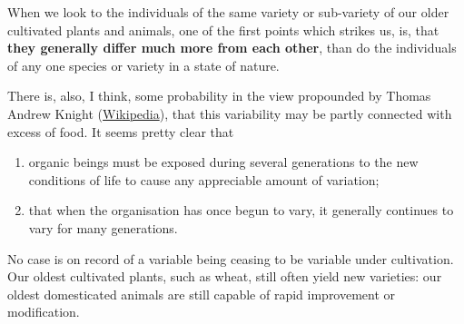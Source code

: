 When we look to the individuals of the same variety or sub-variety of our older cultivated plants and animals, one of the first points which strikes us, is, that \textbf{they generally differ much more from each other}, than do the individuals of any one species or variety in a state of nature.

There is, also, I think, some probability in the view propounded by Thomas Andrew Knight (\href{http://www.wikipedia.org/}{Wikipedia}), that this variability may be partly connected with excess of food. It seems pretty clear that

\begin{enumerate}
\item organic beings must be exposed during several generations to the new conditions of life to cause any appreciable amount of variation;
\item that when the organisation has once begun to vary, it generally continues to vary for many generations.
\end{enumerate}

No case is on record of a variable being ceasing to be variable under cultivation. Our oldest cultivated plants, such as wheat, still often yield new varieties: our oldest domesticated animals are still capable of rapid improvement or modification.